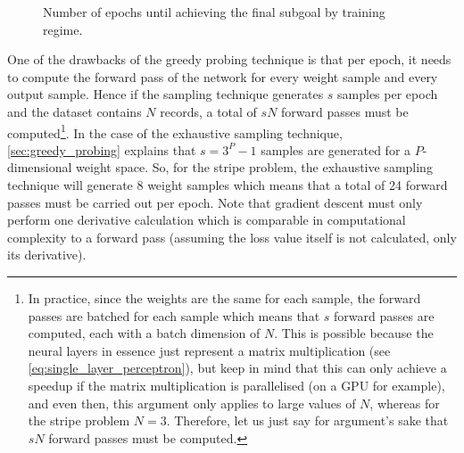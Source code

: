 \begin{figure}
    \centering
    \caption{Number of epochs until achieving the final subgoal by training regime.}
    \label{fig:stripe_num_epochs}
\end{figure}
One of the drawbacks of the greedy probing technique is that per epoch, it needs to compute the forward pass of the network for every weight sample and every output sample. 
Hence if the sampling technique generates $s$ samples per epoch and the dataset contains $N$ records, a total of $sN$ forward passes must be computed\footnote{In practice, since the weights are the same for each sample, the forward passes are batched for each sample which means that $s$ forward passes are computed, each with a batch dimension of $N$. This is possible because the neural layers in essence just represent a matrix multiplication (see \ref{eq:single_layer_perceptron}), but keep in mind that this can only achieve a speedup if the matrix multiplication is parallelised (on a GPU for example), and even then, this argument only applies to large values of $N$, whereas for the stripe problem $N=3$. Therefore, let us just say for argument's sake that $sN$ forward passes must be computed.}.
In the case of the exhaustive sampling technique, \ref{sec:greedy_probing} explains that $s=3^P-1$ samples are generated for a $P$-dimensional weight space.
So, for the stripe problem, the exhaustive sampling technique will generate 8 weight samples which means that a total of 24 forward passes must be carried out per epoch.
Note that gradient descent must only perform one derivative calculation which is comparable in computational complexity to a forward pass (assuming the loss value itself is not calculated, only its derivative).
